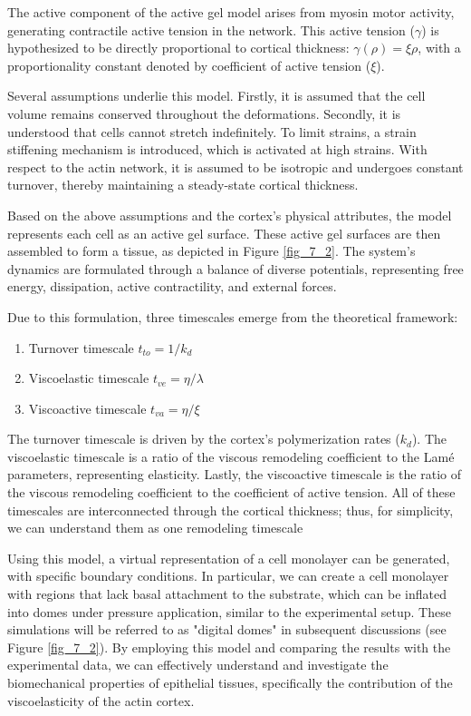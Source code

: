 The active component of the active gel model arises from myosin motor activity, generating contractile active tension in the network. This active tension (\(\gamma\)) is hypothesized to be directly proportional to cortical thickness:	$\gamma(\rho) = \xi \rho$, with a proportionality constant denoted by coefficient of active tension (\(\xi\)).

Several assumptions underlie this model. Firstly, it is assumed that the cell volume remains conserved throughout the deformations. Secondly, it is understood that cells cannot stretch indefinitely. To limit strains, a strain stiffening mechanism is introduced, which is activated at high strains. With respect to the actin network, it is assumed to be isotropic and undergoes constant turnover, thereby maintaining a steady-state cortical thickness.

Based on the above assumptions and the cortex’s physical attributes, the model represents each cell as an active gel surface. These active gel surfaces are then assembled to form a tissue, as depicted in Figure \ref{fig_7_2}. The system’s dynamics are formulated through a balance of diverse potentials, representing free energy, dissipation, active contractility, and external forces.

Due to this formulation, three timescales emerge from the theoretical framework: 

\begin{enumerate}
	\item Turnover timescale \(t_{to} = 1/k_{d}\)
	\item Viscoelastic timescale \(t_{ve} = \eta/\lambda\)
	\item Viscoactive timescale \(t_{va} = \eta/\xi\)
\end{enumerate}

The turnover timescale is driven by the cortex's polymerization rates (\(k_{d}\)). The viscoelastic timescale is a ratio of the viscous remodeling coefficient to the Lamé parameters, representing elasticity. Lastly, the viscoactive timescale is the ratio of the viscous remodeling coefficient to the coefficient of active tension. All of these timescales are interconnected through the cortical thickness; thus, for simplicity, we can understand them as one remodeling timescale

Using this model, a virtual representation of a cell monolayer can be generated, with specific boundary conditions. In particular, we can create a cell monolayer with regions that lack basal attachment to the substrate, which can be inflated into domes under pressure application, similar to the experimental setup. These simulations will be referred to as "digital domes" in subsequent discussions  (see Figure \ref{fig_7_2}). By employing this model and comparing the results with the experimental data, we can effectively understand and investigate the biomechanical properties of epithelial tissues, specifically the contribution of the viscoelasticity of the actin cortex.

